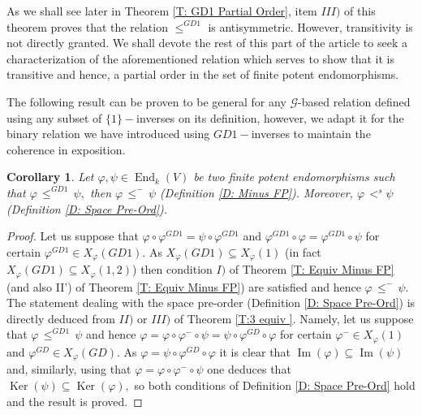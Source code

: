 \documentclass[10pt,a4paper]{amsart}
\newtheorem{cor}[defn]{Corollary}
\theoremstyle{plain}
\theoremstyle{remark}
\numberwithin{equation}{section} \numberwithin{defn}{section}
\newcommand\ed{\operatorname{End}}
\newcommand{\Img}{\operatorname{Im}}
\newcommand\Ker{\operatorname{Ker}}
\newcommand{\f}{\varphi}
\newcommand{\g}{\psi}
\begin{document}
As we shall see later in Theorem \ref{T: GD1 Partial Order}, item $III)$ of this theorem proves that the relation $\leq^{GD1}$ is antisymmetric. However, transitivity is not directly granted. We shall devote the rest of this part of the article to seek a characterization of the aforementioned relation which serves to show that it is transitive and hence, a partial order in the set of finite potent endomorphisms.


The following result can be proven to be general for any $\mathcal{G}$-based relation defined using any subset of $\{1\}-$inverses on its definition, however, we adapt it for the binary relation we have introduced using $GD1-$inverses to maintain the coherence in exposition.

\begin{cor}\label{C: GD1 Implica Space y Minus}
Let $\f , \g \in \ed_k(V)$ be two finite potent endomorphisms such that $\f \, \leq^{GD1} \, \g ,$ then $\f \, \leq^{-} \, \g$ (Definition \ref{D: Minus FP}). Moreover, $\f \, <^s \g $ (Definition \ref{D: Space Pre-Ord}). 
\end{cor}
\begin{proof}
Let us suppose that $\f \circ \f^{GD1}=\g \circ \f^{GD1}$ and $\f^{GD1}\circ \f =\f^{GD1}\circ \g$ for certain $\f^{GD1}\in X_{\f}(GD1).$ As $X_{\f}(GD1)\subseteq X_{\f}(1)$ (in fact $X_{\f}(GD1)\subseteq X_{\f}(1,2)$) then condition $I)$ of Theorem \ref{T: Equiv Minus FP} (and also II') of Theorem \ref{T: Equiv Minus FP}) are satisfied and hence $\f \, \leq^{-} \, \g .$ The statement dealing with the space pre-order (Definition \ref{D: Space Pre-Ord}) is directly deduced from $II)$ or $III)$ of Theorem \ref{T:3 equiv  }. Namely, let us suppose that $\f \, \leq^{GD1} \, \g$ and hence $\f=\f\circ \f^{-}\circ \g=\g \circ \f^{GD}\circ \f$ for certain $\f^{-}\in X_{\f}(1)$ and $\f^{GD}\in X_{\f}(GD).$ As $\f=\g \circ \f^{GD}\circ \f$ it is clear that $\Img(\f)\subseteq \Img(\g)$ and, similarly, using that $\f=\f\circ \f^{-}\circ \g$ one deduces that $\Ker(\g)\subseteq \Ker(\f),$ so both conditions of Definition \ref{D: Space Pre-Ord} hold and the result is proved. 
\end{proof}
\end{document}
